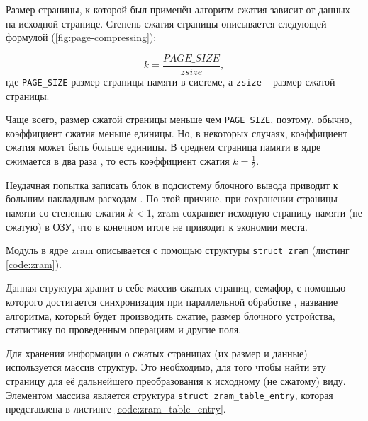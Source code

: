 Размер страницы, к которой был применён алгоритм сжатия зависит от данных на исходной странице. Степень сжатия страницы описывается следующей формулой (\ref{fig:page-compressing}):

\begin{equation}\label{fig:page-compressing}
	k = \frac{PAGE\_SIZE}{zsize},
\end{equation}
где \texttt{PAGE\_SIZE} размер страницы памяти в системе, а \texttt{zsize} -- размер сжатой страницы. 

Чаще всего, размер сжатой страницы меньше чем \texttt{PAGE\_SIZE}, поэтому, обычно, коэффициент сжатия меньше единицы. Но, в некоторых случаях, коэффициент сжатия может быть больше единицы. В среднем страница памяти в ядре сжимается в два раза \cite{in-kernel-memory-compression}, то есть коэффициент сжатия $ k =\frac{1}{2}$.

Неудачная попытка записать блок в подсистему блочного вывода приводит к большим накладным расходам \cite{in-kernel-memory-compression}. По этой причине, при сохранении страницы памяти со степенью сжатия $k < 1$, zram сохраняет исходную страницу памяти (не сжатую) в ОЗУ, что в конечном итоге не приводит к экономии места.

Модуль в ядре zram описывается с помощью структуры \texttt{struct zram} (листинг \ref{code:zram}).


Данная структура хранит в себе массив сжатых страниц, семафор, с помощью которого достигается синхронизация при параллельной обработке \cite{in-kernel-memory-compression}, название алгоритма, который будет производить сжатие, размер блочного устройства, статистику по проведенным операциям и другие поля.

Для хранения информации о сжатых страницах (их размер и данные) используется массив структур. Это необходимо, для того чтобы найти эту страницу для её дальнейшего преобразования к исходному (не сжатому) виду. Элементом массива является структура \texttt{struct zram\_table\_entry}, которая представлена в листинге \ref{code:zram_table_entry}.


